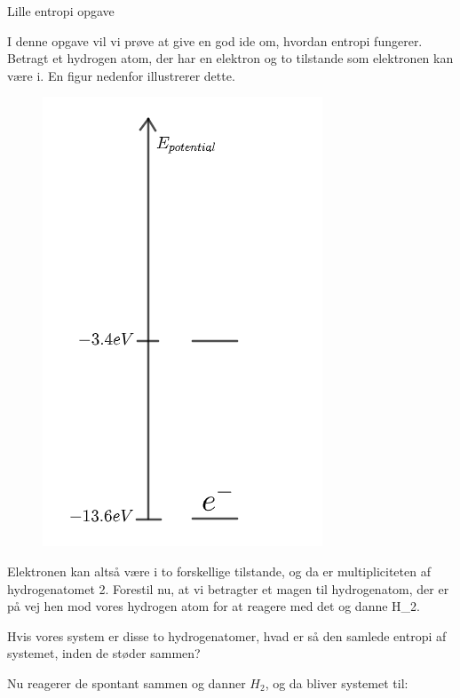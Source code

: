 \documentclass[crop=false, class=memoir]{standalone}
\begin{document}
\begin{opgave}{Lille entropi opgave}

\noindent
I denne opgave vil vi prøve at give en god ide om, hvordan entropi fungerer. Betragt et hydrogen atom, der har en elektron og to tilstande som elektronen kan være i. En figur nedenfor illustrerer dette.

\begin{figure}
    \centering
    \includegraphics[scale=0.4]{Termodynamik/fig/Termentro.png}
\end{figure}

\noindent
Elektronen kan altså være i to forskellige tilstande, og da er multipliciteten af hydrogenatomet 2. Forestil nu, at vi betragter et magen til hydrogenatom, der er på vej hen mod vores hydrogen atom for at reagere med det og danne H_{2}.

\opg Hvis vores system er disse to hydrogenatomer, hvad er så den samlede entropi af systemet, inden de støder sammen?

\noindent
Nu reagerer de spontant sammen og danner $H_{2}$, og da bliver systemet til:


\end{opgave}
\end{document}
